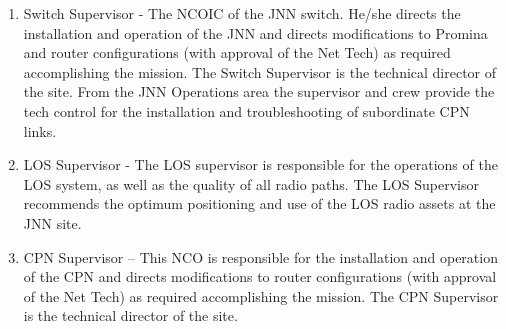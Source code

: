 \documentclass{article}
\begin{document}
\begin{enumerate}
\begin{enumerate}
\item Switch Supervisor - The NCOIC of the JNN switch. He/she directs the installation and operation of the JNN and directs modifications to Promina and router configurations (with approval of the Net Tech) as required accomplishing the mission. The Switch Supervisor is the technical director of the site.  From the JNN Operations area the supervisor and crew provide the tech control for the installation and troubleshooting of subordinate CPN links.
\item LOS Supervisor - The LOS supervisor is responsible for the operations of the LOS system, as well as the quality of all radio paths. The LOS Supervisor recommends the optimum positioning and use of the LOS radio assets at the JNN site.
\item CPN Supervisor – This NCO is responsible for the installation and operation of the CPN and directs modifications to router configurations (with approval of the Net Tech) as required accomplishing the mission.  The CPN Supervisor is the technical director of the site.  
\end{enumerate}
\end{enumerate}

\newpage
\end{document}
